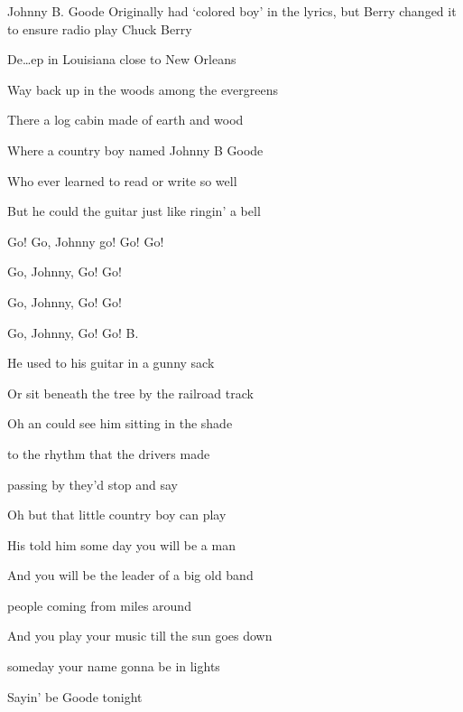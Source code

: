 \begin{SBSong}{Johnny B. Goode}
  {Originally had `colored boy' in the lyrics, but Berry changed it to ensure radio play}
  {Chuck Berry}
  \begin{SBVerse}
    De\ldots ep  in Louisiana close to New Orleans
    
    Way back up in the woods among the evergreens
    
    There  a log cabin made of earth and wood
    
    Where  a country boy named Johnny B Goode
    
    Who  ever learned to read or write so well
    
    But he could  the guitar just like ringin' a bell
  \end{SBVerse}
  \begin{SBChorus}
     Go! Go, Johnny go! Go! Go!
    
    Go, Johnny, Go!  Go!
    
    Go, Johnny, Go!  Go!
    
    Go, Johnny, Go!  Go!  B. 
  \end{SBChorus}
  \begin{SBVerse}
    He used to  his guitar in a gunny sack
    
    Or sit beneath the tree by the railroad track
    
    Oh an  could see him sitting in the shade
    
     to the rhythm that the drivers made
    
     passing by they'd stop and say
    
    Oh  but that little country boy can play
  \end{SBVerse}
  \begin{SBVerse}
    His  told him some day you will be a man
    
    And you will be the leader of a big old band
    
     people coming from miles around
    
    And  you play your music till the sun goes down
    
     someday your name gonna be in lights
    
    Sayin'  be Goode tonight
  \end{SBVerse}
\end{SBSong}
